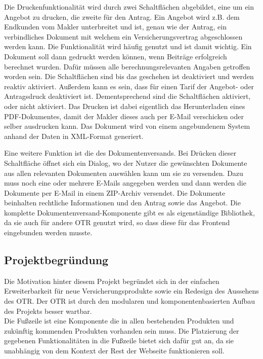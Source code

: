 Die Druckenfunktionalität wird durch zwei Schaltflächen abgebildet, eine um ein Angebot zu drucken, die zweite für den Antrag. Ein Angebot wird z.B. dem Endkunden vom Makler unterbreitet und ist, genau wie der Antrag, ein verbindliches Dokument mit welchem ein Versicherungsvertrag abgeschlossen werden kann. Die Funktionalität wird häufig genutzt und ist damit wichtig. Ein Dokument soll dann gedruckt werden können, wenn Beiträge erfolgreich berechnet wurden. Dafür müssen alle berechnungsrelevanten Angaben getroffen worden sein.
Die Schaltflächen sind bis das geschehen ist deaktiviert und werden reaktiv aktiviert. Außerdem kann es sein, dass für einen Tarif der Angebot- oder Antragsdruck deaktiviert ist. Dementsprechend sind die Schaltflächen aktiviert, oder nicht aktiviert.  Das Drucken ist dabei eigentlich das Herunterladen eines PDF-Dokumentes, damit der Makler dieses auch per E-Mail verschicken oder selber ausdrucken kann. Das Dokument wird von einem angebundenem System anhand der Daten in XML-Format generiert.

Eine weitere Funktion ist die des Dokumentenversands. Bei Drücken dieser Schaltfläche öffnet sich ein Dialog, wo der Nutzer die gewünschten Dokumente aus allen relevanten Dokumenten auswählen kann um sie zu versenden. Dazu muss noch eine oder mehrere E-Mails angegeben werden und dann werden die Dokumente per E-Mail in einem ZIP-Archiv versendet. Die Dokumente beinhalten rechtliche Informationen und den Antrag sowie das Angebot. Die komplette Dokumentenversand-Komponente gibt es als eigenständige Bibliothek, da sie auch für andere \ac{OTR} genutzt wird, so dass diese für das Frontend eingebunden werden musste.

\subsection{Projektbegründung}
\label{projektbegründung}
Die Motivation hinter diesem Projekt begründet sich in der einfachen Erweiterbarkeit für neue Versicherungsprodukte sowie ein Redesign des Aussehens des \ac{OTR}. Der \ac{OTR} ist durch den modularen und komponentenbasierten Aufbau des Projekts besser wartbar. \\
Die Fußzeile ist eine Komponente die in allen bestehenden Produkten und zukünftig kommenden Produkten vorhanden sein muss. Die Platzierung der gegebenen Funktionalitäten in die Fußzeile bietet sich dafür gut an, da sie unabhängig von dem Kontext der Rest der Webseite funktionieren soll.
